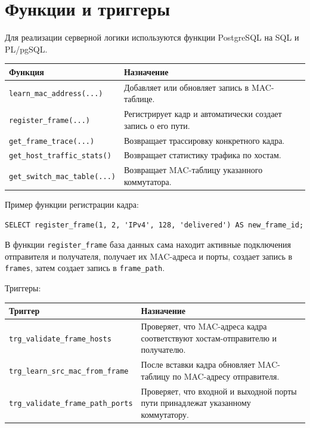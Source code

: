 \documentclass[12pt,a4paper]{article}
\begin{document}
\section{Функции и триггеры}

Для реализации серверной логики используются функции PostgreSQL на SQL и PL/pgSQL.

\begin{longtable}{|p{5.5cm}|p{9cm}|}
\hline
\textbf{Функция} & \textbf{Назначение}\\
\hline
\texttt{learn\_mac\_address(...)} & Добавляет или обновляет запись в MAC-таблице.\\
\hline
\texttt{register\_frame(...)} & Регистрирует кадр и автоматически создает запись о его пути.\\
\hline
\texttt{get\_frame\_trace(...)} & Возвращает трассировку конкретного кадра.\\
\hline
\texttt{get\_host\_traffic\_stats()} & Возвращает статистику трафика по хостам.\\
\hline
\texttt{get\_switch\_mac\_table(...)} & Возвращает MAC-таблицу указанного коммутатора.\\
\hline
\end{longtable}

Пример функции регистрации кадра:

\begin{lstlisting}[caption={Вызов функции регистрации кадра}]
SELECT register_frame(1, 2, 'IPv4', 128, 'delivered') AS new_frame_id;
\end{lstlisting}

В функции \texttt{register\_frame} база данных сама находит активные подключения отправителя и получателя, получает их MAC-адреса и порты, создает запись в \texttt{frames}, затем создает запись в \texttt{frame\_path}.

Триггеры:

\begin{longtable}{|p{5.5cm}|p{9cm}|}
\hline
\textbf{Триггер} & \textbf{Назначение}\\
\hline
\texttt{trg\_validate\_frame\_hosts} & Проверяет, что MAC-адреса кадра соответствуют хостам-отправителю и получателю.\\
\hline
\texttt{trg\_learn\_src\_mac\_from\_frame} & После вставки кадра обновляет MAC-таблицу по MAC-адресу отправителя.\\
\hline
\texttt{trg\_validate\_frame\_path\_ports} & Проверяет, что входной и выходной порты пути принадлежат указанному коммутатору.\\
\hline
\end{longtable}
\end{document}

